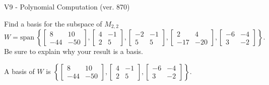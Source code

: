\begin{exercise}
  \begin{exerciseTitle}V9 - Polynomial Computation (ver. 870)\end{exerciseTitle}
  \begin{exerciseStatement}
    Find a basis for the subspace of \(M_{2,2}\) 
\[W=\mathrm{span}\ \left\{\left[\begin{array}{cc}
8 & 10 \\
-44 & -50
\end{array}\right] , \left[\begin{array}{cc}
4 & -1 \\
2 & 5
\end{array}\right] , \left[\begin{array}{cc}
-2 & -1 \\
5 & 5
\end{array}\right] , \left[\begin{array}{cc}
2 & 4 \\
-17 & -20
\end{array}\right] , \left[\begin{array}{cc}
-6 & -4 \\
3 & -2
\end{array}\right]\right\}.\]
 Be sure to explain why your result is a basis.


  \end{exerciseStatement}
  \begin{exerciseAnswer}
   A basis of \(W\) is  \(\left\{\left[\begin{array}{cc}
8 & 10 \\
-44 & -50
\end{array}\right] , \left[\begin{array}{cc}
4 & -1 \\
2 & 5
\end{array}\right] , \left[\begin{array}{cc}
-6 & -4 \\
3 & -2
\end{array}\right]\right\}\).
  


  \end{exerciseAnswer}
\end{exercise}